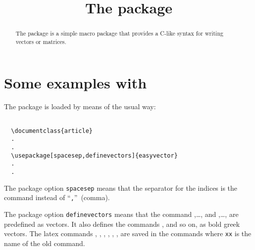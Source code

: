 \documentclass[a4paper,final,11pt]{article}
\title{The package \package{easyvector}}
\begin{document}
\maketitle
\begin{abstract}
The  package is a simple
macro package that provides a C-like syntax for writing vectors or matrices.
\end{abstract}

\tableofcontents
\clearpage
\pagestyle{fpage}

\def\sectionmark#1{\markboth{The package \package{easyvector}}{The package \package{easyvector}}}
\let\chaptermark\sectionmark
\let\subsectionmark\sectionmark

\section{Some examples with }
The package is loaded by means of the usual way:
\begin{verbatim}

  \documentclass{article}
  .
  .
  \usepackage[spacesep,definevectors]{easyvector}
  .
  .

\end{verbatim}
The package option \texttt{spacesep} means that the separator for the
indices is the command  instead of
``\verb|,|''~(comma).

The package option \texttt{definevectors} means that the command
,\ldots,  and ,\ldots,
 are predefined as vectors.  It also defines the commands
,  and so on, as bold greek vectors. 
The latex commands , , ,
, , ,  are saved in
the commands  where \verb'xx' is the name of the old
command.
\end{document}

